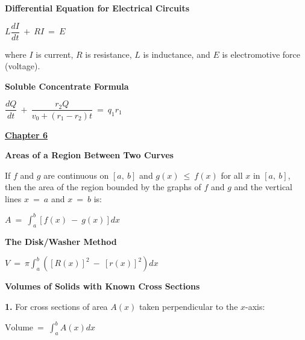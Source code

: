 \documentclass{article}
\begin{document}
\begin{large}
\textbf{Differential Equation for Electrical Circuits}

\hspace{2.5in} $L\dfrac{dI}{dt}\ +\ RI\ =\ E$

\hspace{0.1in} where $I$ is current, $R$ is resistance, $L$ is inductance, and $E$ is electromotive force (voltage).

\textbf{Soluble Concentrate Formula}

\vspace{-0.1in}

\hspace{2.5in} $\dfrac{dQ}{dt}\ +\ \dfrac{r_{2}Q}{v_{0} + (r_{1} - r_{2})t}\ =\ q_{1}r_{1}$

\vspace{-0.1in}

\underline{\textbf{\huge Chapter 6 \phantom{ } \phantom{ } \phantom{ } \phantom{ }}}

\textbf{Areas of a Region Between Two Curves}

\hspace{0.1in} If $f$ and $g$ are continuous on $[a,\ b]$ and $g(x)\ \leq\ f(x)$ for all $x$ in $[a,\ b]$, then the area of the region bounded by the graphs of $f$ and $g$ and the vertical lines $x\ =\ a$ and $x\ =\ b$ is:

\hspace{2.5in} $A\ =\ \displaystyle\int^{b}_{a}[f(x)\ -\ g(x)]dx$

\textbf{The Disk/Washer Method}

\hspace{2.5in} $V\ =\ \pi\displaystyle\int^{b}_{a}([R(x)]^{2}\ -\ [r(x)]^{2})dx$

\textbf{Volumes of Solids with Known Cross Sections}

\hspace{0.1in} \textbf{1.} For cross sections of area $A(x)$ taken perpendicular to the $x$-axis:

\hspace{2.0in} $\text{Volume}\ =\ \displaystyle\int^{b}_{a}A(x)dx$


\end{large}
\end{document}
